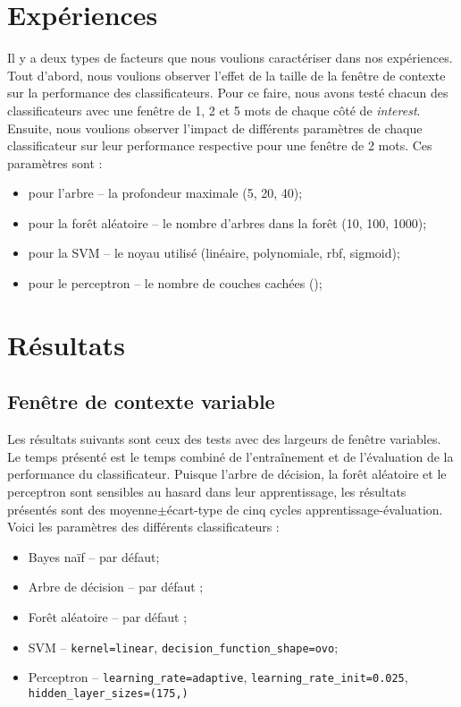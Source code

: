 \documentclass[11pt]{rapport-tp-ia}
\begin{document}
\vspace{3em}
\chapter{Expériences}
Il y a deux types de facteurs que nous voulions caractériser dans nos expériences.
Tout d'abord, nous voulions observer l'effet de la taille de la fenêtre de contexte sur la performance des classificateurs.
Pour ce faire, nous avons testé chacun des classificateurs avec une fenêtre de 1, 2 et 5 mots de chaque côté de \textit{interest}.
Ensuite, nous voulions observer l'impact de différents paramètres de chaque classificateur sur leur performance respective pour une fenêtre de 2 mots.
Ces paramètres sont :

\begin{itemize}
	\item pour l'arbre -- la profondeur maximale (5, 20, 40);
	\item pour la forêt aléatoire -- le nombre d'arbres dans la forêt (10, 100, 1000);
	\item pour la SVM -- le noyau utilisé (linéaire, polynomiale, rbf, sigmoid);
	\item pour le perceptron -- le nombre de couches cachées (); %
\end{itemize}

\vspace{3em}
\chapter{Résultats}
\section{Fenêtre de contexte variable}
Les résultats suivants sont ceux des tests avec des largeurs de fenêtre variables.
Le temps présenté est le temps combiné de l'entraînement et de l'évaluation de la performance du classificateur.
Puisque l'arbre de décision, la forêt aléatoire et le perceptron sont sensibles au hasard dans leur apprentissage, les résultats présentés sont des moyenne$\pm$écart-type de cinq cycles apprentissage-évaluation.
Voici les paramètres des différents classificateurs :
\begin{itemize}
	\item Bayes naïf -- par défaut;
	\item Arbre de décision -- par défaut ;
	\item Forêt aléatoire -- par défaut ;
	\item SVM -- \texttt{kernel=linear}, \texttt{decision\_function\_shape=ovo};
	\item \small Perceptron -- \texttt{learning\_rate=adaptive}, \texttt{learning\_rate\_init=0.025}, \texttt{hidden\_layer\_sizes=(175,)}
\end{itemize}
\end{document}
